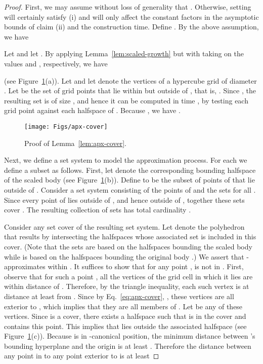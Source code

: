 \documentclass[11pt]{article}   \usepackage[letterpaper,hmargin=2.1cm,vmargin=3cm]{geometry}
\begin{document}
\begin{proof}
First, we may assume without loss of generality that . Otherwise, setting  will certainly satisfy (i) and will only affect the constant factors in the asymptotic bounds of claim (ii) and the construction time. Define . By the above assumption, we have

Let  and let . By applying Lemma~\ref{lem:scaled-growth} but with  taking on the values  and , respectively, we have

(see Figure~\ref{fig:apx-cover}(a)). Let  and let  denote the vertices of a hypercube grid of diameter . Let  be the set of grid points that lie within  but outside of , that is, . Since , the resulting set is of size , and hence it can be computed in time , by testing each grid point against each halfspace of . Because , we have .

\begin{figure}[htbp]
  \centerline{\texttt{[image: Figs/apx-cover]}}
  \caption{Proof of Lemma~\ref{lem:apx-cover}.}
  \label{fig:apx-cover}
\end{figure}


Next, we define a set system to model the approximation process. For each  we define a subset  as follows. First, let  denote the corresponding bounding halfspace of the scaled body  (see Figure~\ref{fig:apx-cover}(b)). Define  to be the subset of points of  that lie outside of . Consider a set system consisting of the points of  and the sets  for all . Since every point of  lies outside of , and hence outside of , together these sets cover . The resulting collection of sets has total cardinality . 

Consider any set cover  of the resulting set system. Let  denote the polyhedron that results by intersecting the halfspaces  whose associated set  is included in this cover. (Note that the sets  are based on the halfspaces bounding the scaled body  while  is based on the halfspaces bounding the original body .) We assert that  -approximates  within . It suffices to show that for any point ,  is not in . First, observe that for such a point , all the vertices of the grid cell in which it lies are within distance  of . Therefore, by the triangle inequality, each such vertex is at distance at least  from . Since by Eq.~\eqref{eq:apx-cover}, , these vertices are all exterior to , which implies that they are all members of . Let  be any of these vertices. Since  is a cover, there exists a halfspace  such that  is in the cover and contains this point. This implies that  lies outside the associated halfspace  (see Figure~\ref{fig:apx-cover}(c)). Because  is in -canonical position, the minimum distance between 's bounding hyperplane and the origin is at least . Therefore the distance between any point in  to any point exterior to  is at least


\end{proof}
\end{document}
